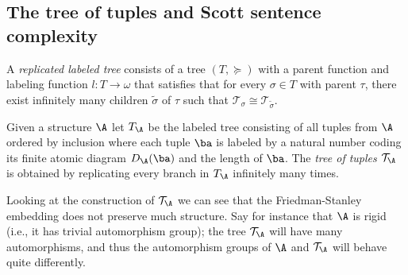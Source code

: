 \documentclass{amsart}
\newcommand{\T}{{\mathcal{T}}}
\begin{document}
\subsection{The tree of tuples and Scott sentence complexity}
\begin{definition}\label{def:replabeledtreed}
   A \emph{replicated labeled tree} consists of a tree $(T,\succeq)$ with a parent function and
   labeling function $l:T\to \omega$ that satisfies that for every $\sigma\in T$
   with parent $\tau$, there exist infinitely many children $\tilde\sigma$ of
   $\tau$ such that $\T_\sigma\cong \T_{\tilde\sigma}$.
\end{definition}
\begin{definition}\label{def:tree-of-tuples}
   Given a structure $\A$ let $T_\A$ be the labeled tree consisting of all
   tuples from $\A$ ordered by inclusion where each tuple $\ba$ is labeled by a
   natural number coding its finite atomic diagram $D_\A(\ba)$ and the length of
   $\ba$. The \emph{tree of tuples $\T_\A$} is obtained by replicating every branch in
   $T_\A$ infinitely many times.
  \end{definition}

Looking at the construction of $\T_\A$ we can see that the
Friedman-Stanley embedding does not preserve much structure. Say for instance
that $\A$ is rigid (i.e., it has trivial automorphism group); the tree $\T_\A$
will have many automorphisms, and thus the automorphism groups of $\A$ and
$\T_\A$ will behave quite differently.
\end{document}
